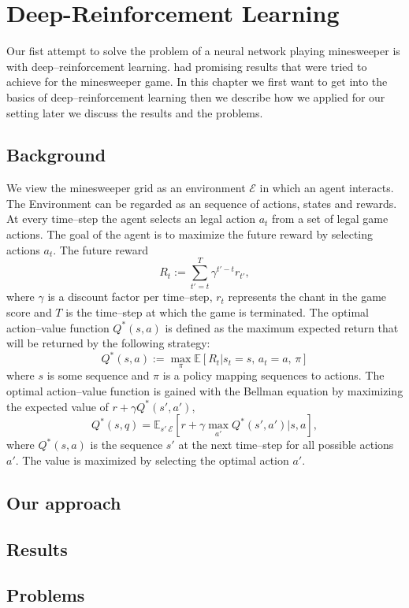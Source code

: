 \chapter{Deep-Reinforcement Learning}
Our fist attempt to solve the problem of a neural network playing minesweeper is with deep--reinforcement learning. 
had promising results that were tried to achieve for the minesweeper game.
In this chapter we first want to get into the basics of deep--reinforcement learning then we describe how we applied for our setting later we discuss the results and the problems.

\section{Background}
We view the minesweeper grid as an environment $\mathcal{E}$ in which an agent interacts. 
The Environment can be regarded as an sequence of actions, states and rewards.
At every time--step the agent selects an legal action $a_t$ from a set of legal game actions. 
The goal of the agent is to maximize the future reward by selecting actions $a_t$. The future reward
\begin{equation}
R_t := \sum_{t'=t}^T \gamma^{t'-t}r_{t'},
\end{equation}
where $\gamma$ is a discount factor per time--step, $r_t$ represents the chant in the game score and $T$ is the time--step at which the game is terminated.
The optimal action--value function $Q^*\left(s,a\right)$ is defined as the maximum expected return that will be returned by the following strategy:
\begin{equation}
Q^*\left(s,a\right):= \max_\pi \mathbb{E} \left[ R_t|s_t=s\text{, }a_t=a\text{, } \pi\right]
\end{equation}
where $s$ is some sequence and $\pi$ is a policy mapping sequences to actions.
The optimal action--value function is gained with the Bellman equation by maximizing the expected value of $r+\gamma Q^*\left(s',a'\right),$
\begin{equation}
Q^*\left(s,q\right)= \mathbb{E}_{s'~\mathcal{E}} \left[ r + \gamma \max_{a'} Q^*\left(s',a'\right)| s,a \right],
\end{equation}
where $Q^*\left(s,a\right)$ is the sequence $s'$ at the next time--step for all possible actions $a'$. The value is maximized by selecting the optimal action $a'$.



\section{Our approach}

\section{Results}

\section{Problems}